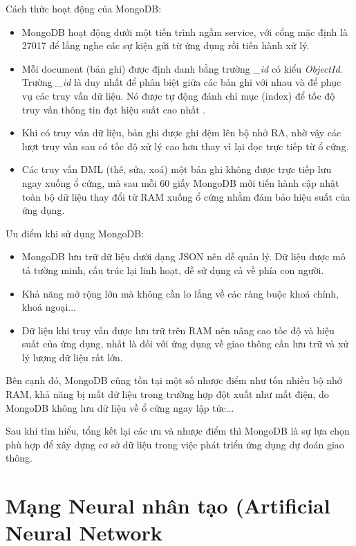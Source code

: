 Cách thức hoạt động của MongoDB:
\begin{itemize}
    \item MongoDB hoạt động dưới một tiến trình ngầm service, với cổng mặc định là 27017 để lắng nghe các sự kiện gửi từ ứng dụng rồi tiến hành xử lý.
    \item Mỗi document (bản ghi) được định danh bằng trường \textit{\_id} có kiểu \textit{ObjectId}. Trường \textit{\_id} là duy nhất để phân biệt giữa các bản ghi với nhau và để phục vụ các truy vấn dữ liệu. Nó được tự động đánh chỉ mục (index) để tốc độ truy vấn thông tin đạt hiệu suất cao nhất \cite{MongoDB2}.
    \item Khi có truy vấn dữ liệu, bản ghi được ghi đệm lên bộ nhớ RA, nhờ vậy các lượt truy vấn sau có tốc độ xử lý cao hơn thay vì lại đọc trực tiếp từ ổ cứng.
    \item Các truy vấn DML (thê, sửa, xoá) một bản ghi không được trực tiếp lưu ngay xuống ổ cứng, mà sau mỗi 60 giấy MongoDB mới tiến hành cập nhật toàn bộ dữ liệu thay đổi từ RAM xuống ổ cứng \cite{MongoDB3} nhằm đảm bảo hiệu suất của ứng dụng.
\end{itemize}

Ưu điểm khi sử dụng MongoDB:
\begin{itemize}
    \item MongoDB lưu trữ dữ liệu dưới dạng JSON nên dễ quản lý. Dữ liệu được mô tả tường minh, cấu trúc lại linh hoạt, dễ sử dụng cả về phía con người.
    \item Khả năng mở rộng lớn mà không cần lo lắng về các ràng buộc khoá chính, khoá ngoại...
    \item Dữ liệu khi truy vấn được lưu trữ trên RAM nên nâng cao tốc độ và hiệu suất của ứng dụng, nhất là đối với ứng dụng về giao thông cần lưu trữ và xử lý lượng dữ liệu rất lớn.
\end{itemize}

Bên cạnh đó, MongoDB cũng tồn tại một số nhược điểm như tốn nhiều bộ nhớ RAM, khả năng bị mất dữ liệu trong trường hợp đột xuất như mất điện, do MongoDB không lưu dữ liệu về ổ cứng ngay lập tức... 

Sau khi tìm hiểu, tổng kết lại các ưu và nhược điểm thì MongoDB là sự lựa chọn phù hợp để xây dựng cơ sở dữ liệu trong việc phát triển ứng dụng dự đoán giao thông.

\section{Mạng Neural nhân tạo (Artificial Neural Network}
